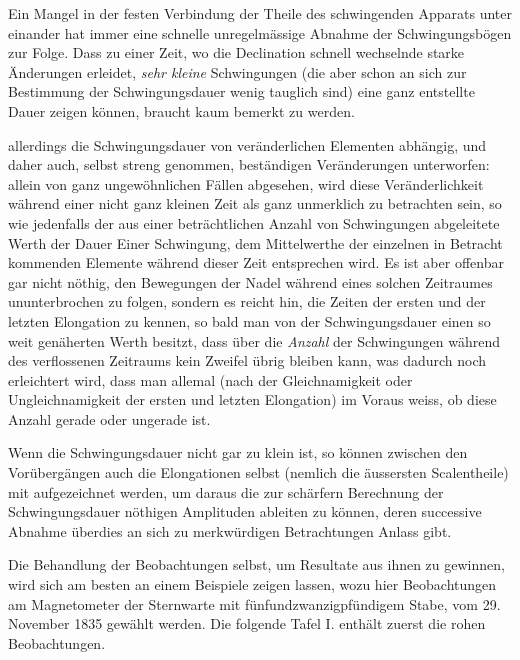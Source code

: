 \expandafter\def\csname HistoricalNoteText391\endcsname{Ein Mangel in der festen Verbindung der Theile des schwingenden Apparats unter einander hat immer eine schnelle unregelmässige Abnahme der Schwingungsbögen zur Folge.}
\expandafter\def\csname HistoricalNoteText382\endcsname{Dass zu einer Zeit, wo die Declination schnell wechselnde starke Änderungen erleidet, \textit{sehr kleine} Schwingungen (die aber schon an sich zur Bestimmung der Schwingungsdauer wenig tauglich sind) eine ganz entstellte Dauer zeigen können, braucht kaum bemerkt zu werden.}
\par\clearpage
{}
\noindent allerdings die Schwingungsdauer von veränderlichen Elementen abhängig, und daher auch, selbst streng genommen, beständigen Veränderungen unterworfen: allein von ganz ungewöhnlichen Fällen abgesehen, wird diese Veränderlichkeit während einer nicht ganz kleinen Zeit als ganz unmerklich zu betrachten sein, so wie jedenfalls der aus einer beträchtlichen Anzahl von Schwingungen abgeleitete Werth der Dauer Einer Schwingung, dem Mittelwerthe der einzelnen in Betracht kommenden Elemente während dieser Zeit entsprechen wird. Es ist aber offenbar gar nicht nöthig, den Bewegungen der Nadel während eines solchen Zeitraumes ununterbrochen zu folgen, sondern es reicht hin, die Zeiten der ersten und der letzten Elongation zu kennen, so bald man von der Schwingungsdauer einen so weit genäherten Werth besitzt, dass über die \textit{Anzahl} der Schwingungen während des verflossenen Zeitraums kein Zweifel übrig bleiben kann, was dadurch noch erleichtert wird, dass man allemal (nach der Gleichnamigkeit oder Ungleichnamigkeit der ersten und letzten Elongation) im Voraus weiss, ob diese Anzahl gerade oder ungerade ist.

Wenn die Schwingungsdauer nicht gar zu klein ist, so können zwischen den Vorübergängen auch die Elongationen selbst (nemlich die äussersten Scalentheile) mit aufgezeichnet werden, um daraus die zur schärfern Berechnung der Schwingungsdauer nöthigen Amplituden ableiten zu können, deren successive Abnahme überdies an sich zu merkwürdigen Betrachtungen Anlass gibt.

Die Behandlung der Beobachtungen selbst, um Resultate aus ihnen zu gewinnen, wird sich am besten an einem Beispiele zeigen lassen, wozu hier Beobachtungen am Magnetometer der Sternwarte mit fünfundzwanzigpfündigem Stabe, vom 29. November 1835 gewählt werden. Die folgende Tafel I. enthält zuerst die rohen Beobachtungen.

